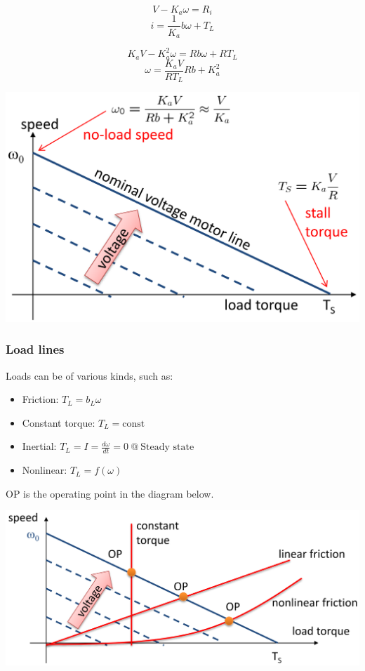 \documentclass[11pt]{article}
\begin{document}
\[V - K_a \omega = R_i\]
\[i = \frac{1}{K_a} b \omega + T_L\]

\[K_a V - K_a^2 \omega = Rb \omega + R T_L\]
\[\omega = \frac{K_aV}{RT_L}{Rb + K_a^2}\]

\begin{center}
\includegraphics[width=.9\linewidth]{./images/dc-motor-steady-state-speed-torque-curve-graph.png}
\end{center}

 \newpage
\subsubsection{Load lines}
\label{sec:org081c767}
Loads can be of various kinds, such as:
\begin{itemize}
\item Friction: \(T_L = b_L \omega\)
\item Constant torque: \(T_L = \text{const}\)
\item Inertial: \(T_L = I = \frac{d \omega}{dt} = 0 \ @ \ \text{Steady state}\)
\item Nonlinear: \(T_L = f(\omega)\)
\end{itemize}

OP is the operating point in the diagram below.
\begin{center}
\includegraphics[width=.9\linewidth]{./images/dc-motor-speed-torque-curve-load-lines.png}
\end{center}
\end{document}
